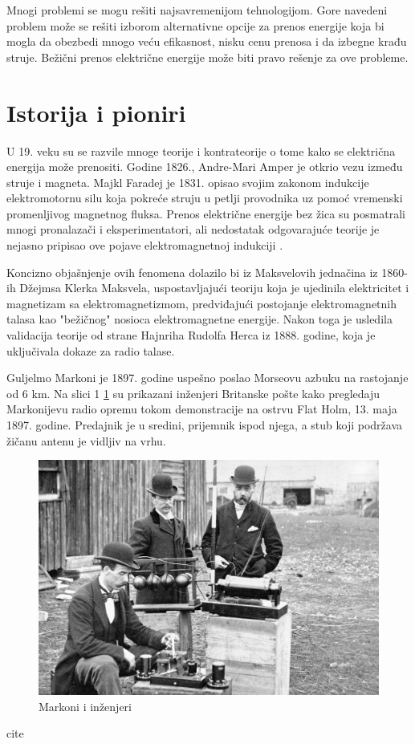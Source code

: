 \documentclass[a4paper]{article}
\begin{document}
Mnogi problemi se mogu rešiti najsavremenijom tehnologijom. Gore navedeni problem može se rešiti izborom alternativne opcije za prenos energije koja bi mogla da obezbedi mnogo veću efikasnost, nisku cenu prenosa i da izbegne krađu struje. Bežični prenos električne energije može biti pravo rešenje za ove probleme.

\section{Istorija i pioniri}

U 19. veku su se razvile mnoge teorije i kontrateorije o tome kako se električna energija može prenositi. Godine 1826., Andre-Mari Amper je otkrio vezu između struje i magneta. Majkl Faradej je 1831. opisao svojim zakonom indukcije elektromotornu silu koja pokreće struju u petlji provodnika uz pomoć vremenski promenljivog magnetnog fluksa. Prenos električne energije bez žica su posmatrali mnogi pronalazači i eksperimentatori, ali nedostatak odgovarajuće teorije je nejasno pripisao ove pojave elektromagnetnoj indukciji \cite{enwiki:1118144890}.

Koncizno objašnjenje ovih fenomena dolazilo bi iz Maksvelovih jednačina iz 1860-ih Džejmsa Klerka Maksvela, uspostavljajući teoriju koja je ujedinila elektricitet i magnetizam sa elektromagnetizmom, predviđajući postojanje elektromagnetnih talasa kao "bežičnog" nosioca elektromagnetne energije.
Nakon toga je usledila validacija teorije od strane Hajnriha Rudolfa Herca iz 1888. godine, koja je uključivala dokaze za radio talase.

Guljelmo Markoni je 1897. godine uspešno poslao Morseovu azbuku na rastojanje od 6 km.
Na slici 1 \ref{fig:my_labela} su prikazani inženjeri Britanske pošte kako pregledaju Markonijevu radio opremu tokom demonstracije na ostrvu Flat Holm, 13. maja 1897. godine. Predajnik je u sredini, prijemnik ispod njega, a stub koji podržava žičanu antenu je vidljiv na vrhu.

\begin{figure}[h!]
    \centering
    \includegraphics[scale=0.2]{Markoni.jpg}
    \caption{Markoni i inženjeri}
    \label{fig:my_labela}
\end{figure}
cite
\end{document}
